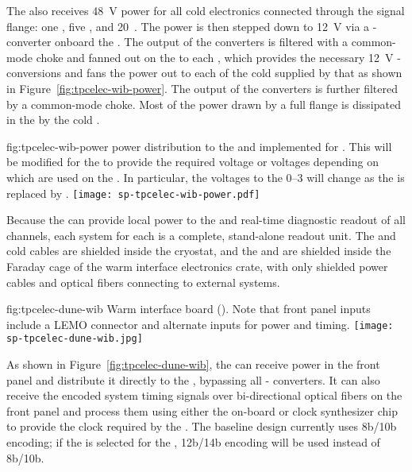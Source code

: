 The  also receives \SI{48}{V}  power for all cold
electronics connected through the  signal flange: 
one , five , and \num{20}~. 
The  power is then stepped down to \SI{12}{V} via 
a - converter onboard the . The output 
of the  converters is filtered with a common-mode choke 
and fanned out on the  to each , which provides the 
necessary \SI{12}{V} - conversions and fans
the  power out to each of the cold  supplied 
by that  as shown in Figure~\ref{fig:tpcelec-wib-power}. 
The output of the  converters is further filtered by a 
common-mode choke. Most of the power drawn by a full flange is 
dissipated in the  by the cold .

\begin{dunefigure}
{fig:tpcelec-wib-power}
{ power distribution to the  and  
implemented for . This will be modified for the 
 to provide the required voltage or voltages 
depending on which  are used on the . 
In particular, the voltages to the  \numrange{0}{3} 
will change as the   is replaced by . }
\texttt{[image: sp-tpcelec-wib-power.pdf]}
\end{dunefigure}

Because the  can provide local power to the  
and real-time diagnostic readout of all channels, each  
system for each  is a complete, stand-alone readout unit. 
The  and cold cables are shielded inside the cryostat, 
and the  and  are shielded inside the Faraday 
cage of the warm interface electronics crate, with only shielded power 
cables and optical fibers connecting to external systems.

\begin{dunefigure}
{fig:tpcelec-dune-wib}
{Warm interface board (). Note that front panel inputs include 
a LEMO connector and alternate inputs for  power and timing.}
\texttt{[image: sp-tpcelec-dune-wib.jpg]}
\end{dunefigure}

As shown in Figure~\ref{fig:tpcelec-dune-wib}, the  can 
receive  power in the front panel and distribute it directly 
to the , bypassing all - converters.
It can also receive the encoded system timing signals over bi-directional 
optical fibers on the front panel and process them using either
the on-board  or clock synthesizer chip to provide the 
clock required by the . The baseline  design 
currently uses 8b/10b encoding; if the   
 is selected for the  , 
12b/14b encoding will be used instead of 8b/10b.

